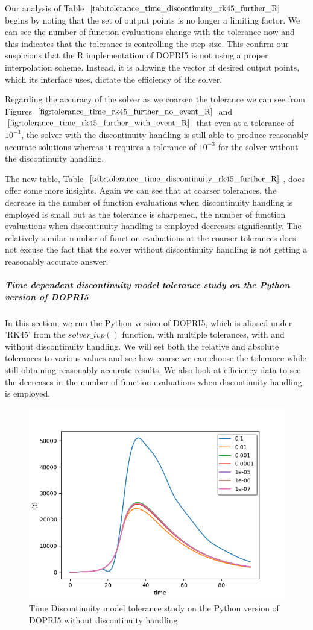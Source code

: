 Our analysis of Table $\ref{tab:tolerance_time_discontinuity_rk45_further_R}$ begins by noting that the set of output points is no longer a limiting factor. We can see the number of function evaluations change with the tolerance now and this indicates that the tolerance is controlling the step-size. This confirm our suspicions that the R implementation of DOPRI5 is not using a proper interpolation scheme. Instead, it is allowing the vector of desired output points, which its interface uses, dictate the efficiency of the solver.

Regarding the accuracy of the solver as we coarsen the tolerance we can see from Figures $\ref{fig:tolerance_time_rk45_further_no_event_R}$ and $\ref{fig:tolerance_time_rk45_further_with_event_R}$ that even at a tolerance of $10^{-1}$, the solver with the discontinuity handling is still able to produce reasonably accurate solutions whereas it requires a tolerance of $10^{-3}$ for the solver without the discontinuity handling.

The new table, Table $\ref{tab:tolerance_time_discontinuity_rk45_further_R}$, does offer some more insights. Again we can see that at coarser tolerances, the decrease in the number of function evaluations when discontinuity handling is employed is small but as the tolerance is sharpened, the number of function evaluations when discontinuity handling is employed decreases significantly. The relatively similar number of function evaluations at the coarser tolerances does not excuse the fact that the solver without discontinuity handling is not getting a reasonably accurate answer. 

\subparagraph{Time dependent discontinuity model tolerance study on the Python version of DOPRI5}
In this section, we run the Python version of DOPRI5, which is aliased under 'RK45' from the $solver\_ivp()$ function, with multiple tolerances, with and without discontinuity handling. We will set both the relative and absolute tolerances to various values and see how coarse we can choose the tolerance while still obtaining reasonably accurate results. We also look at efficiency data to see the decreases in the number of function evaluations when discontinuity handling is employed.

\begin{figure}[H]
\centering
\includegraphics[width=0.7\linewidth]{./figures/tolerance_time_rk45_no_event_py}
\caption{Time Discontinuity model tolerance study on the Python version of DOPRI5 without discontinuity handling}
\label{fig:tolerance_time_rk45_no_event_py}
\end{figure}

